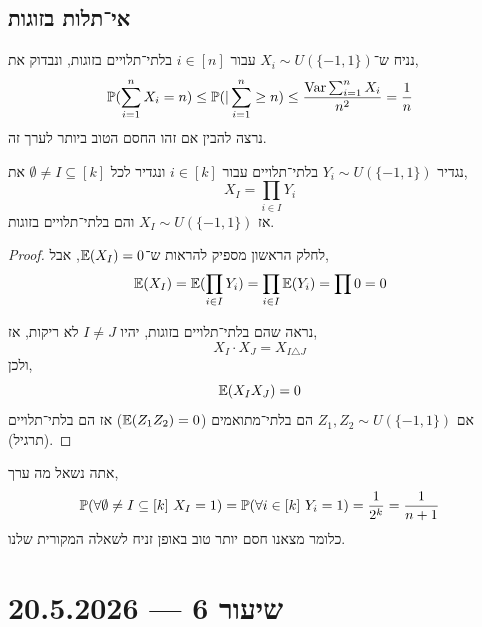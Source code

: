 \subsection{אי־תלות בזוגות}
נניח ש־$X_i \sim U(\{-1, 1\})$ עבור $i \in [n]$ בלתי־תלויים בזוגות, ונבדוק את,
\[
	\mathbb{P}(\sum_{i = 1}^n X_i = n)
	\le \mathbb{P}(|\sum_{i = 1}^n \ge n)
	\le \frac{\operatorname{Var} \sum_{i = 1}^n X_i}{n^2}
	= \frac{1}{n}
\]
נרצה להבין אם זהו החסם הטוב ביותר לערך זה.

\begin{proposition}
	נגדיר $Y_i \sim U(\{-1, 1\})$ בלתי־תלויים עבור $i \in [k]$ ונגדיר לכל $\emptyset \ne I \subseteq [k]$ את,
	\[
		X_I
		= \prod_{i \in I} Y_i
	\]
	אז $X_I \sim U(\{-1, 1\})$ והם בלתי־תלויים בזוגות.
\end{proposition}
\begin{proof}
	לחלק הראשון מספיק להראות ש־$\mathbb{E}(X_I) = 0$, אבל,
	\[
		\mathbb{E}(X_I)
		= \mathbb{E}(\prod_{i \in I} Y_i)
		= \prod_{i \in I} \mathbb{E}(Y_i)
		= \prod 0
		= 0
	\]

	נראה שהם בלתי־תלויים בזוגות, יהיו $I \ne J$ לא ריקות, אז,
	\[
		X_I \cdot X_J
		= X_{I \triangle J}
	\]
	ולכן,
	\[
		\mathbb{E}(X_I X_J)
		= 0
	\]
	אם $Z_1, Z_2 \sim U(\{-1, 1\})$ הם בלתי־מתואמים ($\mathbb{E}(Z_1 Z_2) = 0$) אז הם בלתי־תלויים (תרגיל).
\end{proof}
אתה נשאל מה ערך,
\[
	\mathbb{P}(\forall \emptyset \ne I \subseteq [k]\ X_I = 1)
	= \mathbb{P}(\forall i \in [k]\ Y_i = 1)
	= \frac{1}{2^k}
	= \frac{1}{n + 1}
\]
כלומר מצאנו חסם יותר טוב באופן זניח לשאלה המקורית שלנו.

\section{שיעור 6 --- 20.5.2026}
